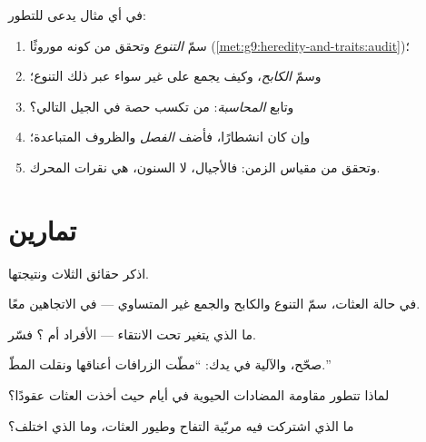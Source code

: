 \begin{method}\label{met:g9:how-species-change:run}
في أي مثال يدعى للتطور:
\begin{enumerate}
  \item سمّ \emph{التنوع} وتحقق من كونه موروثًا
        (\cref{met:g9:heredity-and-traits:audit})؛
  \item وسمّ \emph{الكابح}، وكيف يجمع على غير سواء عبر
        ذلك التنوع؛
  \item وتابع \emph{المحاسبة}:  من تكسب حصة في
        الجيل التالي؟
  \item وإن كان انشطارًا، فأضف \emph{الفصل} والظروف
        المتباعدة؛
  \item وتحقق من مقياس الزمن: فالأجيال، لا السنون، هي
        نقرات المحرك.
\end{enumerate}
\end{method}

\section{تمارين}

\begin{exercise}[$\star$]\label{exo:g9:how-species-change:1}
اذكر حقائق  الثلاث ونتيجتها.
\end{exercise}

\begin{exercise}[$\star$]\label{exo:g9:how-species-change:2}
في حالة العثات، سمّ التنوع والكابح والجمع غير المتساوي
--- في الاتجاهين معًا.
\end{exercise}

\begin{exercise}[$\star$]\label{exo:g9:how-species-change:3}
ما الذي يتغير تحت الانتقاء --- الأفراد أم ؟
فسّر.
\end{exercise}

\begin{exercise}[$\star$]\label{exo:g9:how-species-change:4}
صحّح، والآلية في يدك: ``مطّت الزرافات أعناقها ونقلت
المطّ.''
\end{exercise}

\begin{exercise}[$\star$]\label{exo:g9:how-species-change:5}
لماذا تتطور مقاومة المضادات الحيوية في أيام حيث أخذت
العثات عقودًا؟
\end{exercise}

\begin{exercise}[$\star$]\label{exo:g9:how-species-change:6}
ما الذي اشتركت فيه مربّية التفاح وطيور العثات، وما الذي
اختلف؟
\end{exercise}

